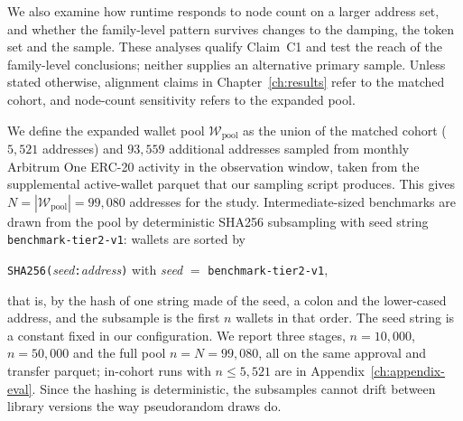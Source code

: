 
We also examine how runtime responds to node count on a larger address set, and whether the family-level pattern survives changes to the damping, the token set and the sample. These analyses qualify Claim~C1 and test the reach of the family-level conclusions; neither supplies an alternative primary sample. Unless stated otherwise, alignment claims in Chapter~\ref{ch:results} refer to the matched cohort, and node-count sensitivity refers to the expanded pool.


We define the expanded wallet pool $\mathcal{W}_{\mathrm{pool}}$ as the union of the matched cohort ($5{,}521$ addresses) and $93{,}559$ additional addresses sampled from monthly Arbitrum One ERC-20 activity in the observation window, taken from the supplemental active-wallet parquet that our sampling script produces. This gives $N=|\mathcal{W}_{\mathrm{pool}}|=99{,}080$ addresses for the study. Intermediate-sized benchmarks are drawn from the pool by deterministic SHA256 subsampling with seed string \texttt{benchmark-tier2-v1}: wallets are sorted by
\begin{center}
\texttt{SHA256(}\textit{seed}\texttt{:}\textit{address}\texttt{)} with \textit{seed} $=$ \texttt{benchmark-tier2-v1},
\end{center}
that is, by the hash of one string made of the seed, a colon and the lower-cased address, and the subsample is the first $n$ wallets in that order. The seed string is a constant fixed in our configuration. We report three stages, $n=10{,}000$, $n=50{,}000$ and the full pool $n=N=99{,}080$, all on the same approval and transfer parquet; in-cohort runs with $n\le 5{,}521$ are in Appendix~\ref{ch:appendix-eval}. Since the hashing is deterministic, the subsamples cannot drift between library versions the way pseudorandom draws do.

